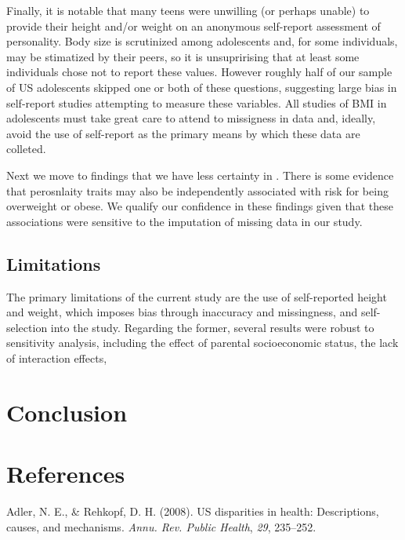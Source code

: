 \documentclass[man]{apa6}
\begin{document}
Finally, it is notable that many teens were unwilling (or perhaps unable) to provide their height and/or weight on an anonymous self-report assessment of personality. Body size is scrutinized among adolescents and, for some individuals, may be stimatized by their peers, so it is unsuprirising that at least some individuals chose not to report these values. However roughly half of our sample of US adolescents skipped one or both of these questions, suggesting large bias in self-report studies attempting to measure these variables. All studies of BMI in adolescents must take great care to attend to missigness in data and, ideally, avoid the use of self-report as the primary means by which these data are colleted.

Next we move to findings that we have less certainty in . There is some evidence that perosnlaity traits may also be independently associated with risk for being overweight or obese. We qualify our confidence in these findings given that these associations were sensitive to the imputation of missing data in our study.

\hypertarget{limitations}{%
\subsection{Limitations}\label{limitations}}

The primary limitations of the current study are the use of self-reported height and weight, which imposes bias through inaccuracy and missingness, and self-selection into the study. Regarding the former, several results were robust to sensitivity analysis, including the effect of parental socioeconomic status, the lack of interaction effects,

\hypertarget{conclusion}{%
\section{Conclusion}\label{conclusion}}

\newpage

\hypertarget{references}{%
\section{References}\label{references}}

\begingroup
\setlength{\parindent}{-0.5in}
\setlength{\leftskip}{0.5in}

\hypertarget{refs}{}
\leavevmode\hypertarget{ref-adler2008us}{}%
Adler, N. E., \& Rehkopf, D. H. (2008). US disparities in health: Descriptions, causes, and mechanisms. \emph{Annu. Rev. Public Health}, \emph{29}, 235--252.
\end{document}
